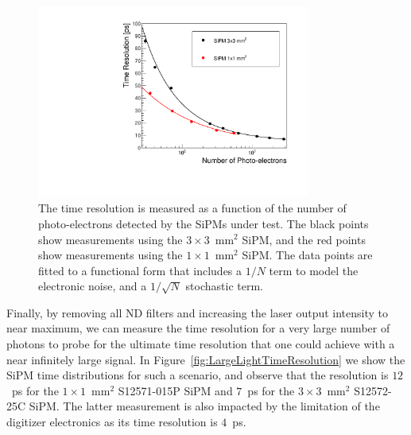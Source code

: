 \begin{figure}[htbp] 
\centering
\includegraphics[width=0.8\textwidth]{figures/TimeResolutionVsNPhotons.pdf}
\caption{ The time resolution is measured as a function of the number of photo-electrons 
detected by the SiPMs under test. The black points show measurements using the
$3\times3$~$\mathrm{mm}^{2}$ SiPM, and the red points show measurements
using the $1\times1$~$\mathrm{mm}^{2}$ SiPM. The data points are fitted to a functional
form that includes a $1/N$ term to model the electronic noise, and a $1/\sqrt{N}$ stochastic 
term. 
\label{fig:TimeResolutionVsNPhotons}
} 
\end{figure} 


Finally, by removing all ND filters and increasing the laser output intensity to near 
maximum, we can measure the time resolution for a very large number of photons 
to probe for the ultimate time resolution that one could achieve with a near 
infinitely large signal. In Figure~\ref{fig:LargeLightTimeResolution} we show 
the SiPM time distributions for such a scenario, and observe that the resolution 
is $12$~ps for the $1\times1$~$\mathrm{mm}^{2}$  S12571-015P SiPM and
$7$~ps for the $3\times 3$~$\mathrm{mm}^{2}$ S12572-25C SiPM. 
The latter measurement is also impacted by the limitation
of the digitizer electronics as its time resolution is $4$~ps. 

